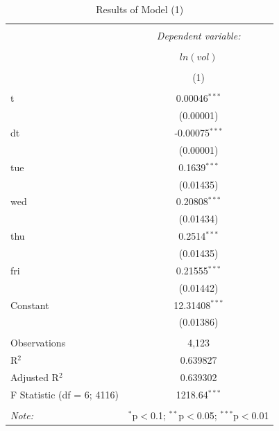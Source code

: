 \documentclass{article}\usepackage[]{graphicx}\usepackage[]{color}
\begin{document}
\begin{table}[h!] \centering 
      \caption{Results of Model (1)} 
      \label{tab1} 
      \begin{tabular}{@{\extracolsep{5pt}}lc} 
          \\[-1.8ex]\hline 
          \hline \\[-1.8ex] 
           & \multicolumn{1}{c}{\textit{Dependent variable:}} \\ 
          \\[-1.8ex] & \multicolumn{1}{c}{$ln(vol)$} \\ 
          \\[-1.8ex] & (1) \\ 
          \hline \\[-1.8ex] 
           t & 0.00046$^{***}$ \\ 
            & (0.00001) \\ 
           dt & -0.00075$^{***}$  \\ 
            & (0.00001)  \\ 
           tue & 0.1639$^{***}$  \\ 
            & (0.01435) \\ 
           wed & 0.20808$^{***}$  \\ 
            & (0.01434)  \\ 
           thu & 0.2514$^{***}$  \\ 
            & (0.01435)  \\ 
           fri & 0.21555$^{***}$  \\ 
            & (0.01442)  \\ 
           Constant & 12.31408$^{***}$  \\ 
            & (0.01386)  \\ 
          \hline \\[-1.8ex] 
          Observations & 4,123  \\ 
          R$^{2}$ & 0.639827  \\ 
          Adjusted R$^{2}$ & 0.639302 \\ 
          F Statistic (df = 6; 4116) & 1218.64$^{***}$  \\ 
          \hline 
          \hline \\[-1.8ex] 
          \textit{Note:}  & \multicolumn{1}{r}{$^{*}$p$<$0.1; $^{**}$p$<$0.05; $^{***}$p$<$0.01} \\ 
      \end{tabular} 
\end{table} 
\end{document}
